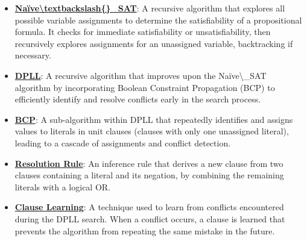 \documentclass{article}%
\begin{document}
\begin{itemize}[leftmargin=*]%
\item \href{https://purdue.brightspace.com/d2l/common/assets/pdfjs-d2l-dist/1.0.14-legacy/web/viewer.html?file=\%2Fcontent\%2Fenforced\%2F1095467-wl.202510.CS.24300.001\%2F15L2-SAT.pdf\%3Fou\%3D1095467\&lang=en-us\&container=d2l-fileviewer-rendered-pdf\&fullscreen=d2l-fileviewer-rendered-pdf-dialog\&height=667#page=18}{\textbf{Naïve\textbackslash{}textbackslash\{\}\_SAT}}: A recursive algorithm that explores all possible variable assignments to determine the satisfiability of a propositional formula. It checks for immediate satisfiability or unsatisfiability, then recursively explores assignments for an unassigned variable, backtracking if necessary.%
\item \href{https://purdue.brightspace.com/d2l/common/assets/pdfjs-d2l-dist/1.0.14-legacy/web/viewer.html?file=\%2Fcontent\%2Fenforced\%2F1095467-wl.202510.CS.24300.001\%2F15L2-SAT.pdf\%3Fou\%3D1095467\&lang=en-us\&container=d2l-fileviewer-rendered-pdf\&fullscreen=d2l-fileviewer-rendered-pdf-dialog\&height=667#page=17}{\textbf{DPLL}}: A recursive algorithm that improves upon the Naïve\textbackslash{}_SAT algorithm by incorporating Boolean Constraint Propagation (BCP) to efficiently identify and resolve conflicts early in the search process.%
\item \href{https://purdue.brightspace.com/d2l/common/assets/pdfjs-d2l-dist/1.0.14-legacy/web/viewer.html?file=\%2Fcontent\%2Fenforced\%2F1095467-wl.202510.CS.24300.001\%2F15L2-SAT.pdf\%3Fou\%3D1095467\&lang=en-us\&container=d2l-fileviewer-rendered-pdf\&fullscreen=d2l-fileviewer-rendered-pdf-dialog\&height=667#page=20}{\textbf{BCP}}: A sub-algorithm within DPLL that repeatedly identifies and assigns values to literals in unit clauses (clauses with only one unassigned literal), leading to a cascade of assignments and conflict detection.%
\item \href{https://purdue.brightspace.com/d2l/common/assets/pdfjs-d2l-dist/1.0.14-legacy/web/viewer.html?file=\%2Fcontent\%2Fenforced\%2F1095467-wl.202510.CS.24300.001\%2F15L2-SAT.pdf\%3Fou\%3D1095467\&lang=en-us\&container=d2l-fileviewer-rendered-pdf\&fullscreen=d2l-fileviewer-rendered-pdf-dialog\&height=667#page=32}{\textbf{Resolution Rule}}: An inference rule that derives a new clause from two clauses containing a literal and its negation, by combining the remaining literals with a logical OR.%
\item \href{https://purdue.brightspace.com/d2l/common/assets/pdfjs-d2l-dist/1.0.14-legacy/web/viewer.html?file=\%2Fcontent\%2Fenforced\%2F1095467-wl.202510.CS.24300.001\%2F15L2-SAT.pdf\%3Fou\%3D1095467\&lang=en-us\&container=d2l-fileviewer-rendered-pdf\&fullscreen=d2l-fileviewer-rendered-pdf-dialog\&height=667#page=35}{\textbf{Clause Learning}}: A technique used to learn from conflicts encountered during the DPLL search. When a conflict occurs, a clause is learned that prevents the algorithm from repeating the same mistake in the future.%

\end{itemize}
\end{document}
